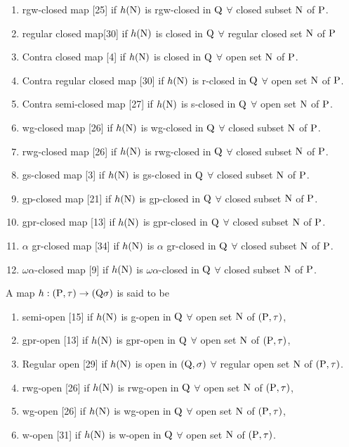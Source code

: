\begin{dfn}
\begin{enumerate}
\item  rgw-closed map [25] if $h(\mathrm{N})$ is rgw-closed in $\mathrm{Q}$  $\forall$   closed subset $\mathrm{N}$ of $\mathrm{P}$. 
\item  regular closed map[30] if $h(\mathrm{N})$ is closed in $\mathrm{Q}$  $\forall$   regular closed set $\mathrm{N}$ of $\mathrm{P}$ 
\item  Contra closed map [4] if $h(\mathrm{N})$ is closed in $\mathrm{Q}$  $\forall$   open set $\mathrm{N}$ of $\mathrm{P}$.  
\item  Contra regular closed map [30] if $h(\mathrm{N})$ is r-closed in $\mathrm{Q}$  $\forall$ open set $\mathrm{N}$ of $\mathrm{P}$. 
\item  Contra semi-closed map [27] if $h(\mathrm{N})$ is s-closed in $\mathrm{Q}$  $\forall$ open set $\mathrm{N}$ of $\mathrm{P}$.  
\item  wg-closed map [26] if $h(\mathrm{N})$ is wg-closed in $\mathrm{Q}$  $\forall$  closed subset $\mathrm{N}$ of $\mathrm{P}$.  
\item  rwg-closed map [26] if $h(\mathrm{N})$ is rwg-closed in $\mathrm{Q}$  $\forall$  closed subset $\mathrm{N}$ of $\mathrm{P}$.  
\item  gs-closed map [3] if $h(\mathrm{N})$ is gs-closed in $\mathrm{Q}$  $\forall$  closed subset $\mathrm{N}$ of $\mathrm{P}$.  
\item  gp-closed map [21] if $h(\mathrm{N})$ is gp-closed in $\mathrm{Q}$  $\forall$   closed subset $\mathrm{N}$ of $\mathrm{P}$.  
\item  gpr-closed map [13] if $h(\mathrm{N})$ is gpr-closed in $\mathrm{Q}$  $\forall$   closed subset $\mathrm{N}$ of $\mathrm{P}$.  
\item  $\alpha$ gr-closed map [34] if $h(\mathrm{N})$ is $\alpha$ gr-closed in $\mathrm{Q}$  $\forall$   closed subset $\mathrm{N}$ of $\mathrm{P}$.  
\item  $\omega\alpha$-closed map [9] if $h(\mathrm{N})$ is $\omega\alpha$-closed in $\mathrm{Q}$  $\forall$ closed subset $\mathrm{N}$ of $\mathrm{P}$.  
\end{enumerate}
\end{dfn}

\begin{dfn}\label{dfn1.4.2}
A map $h: (\mathrm{P}, \tau) \rightarrow (\mathrm{Q} \sigma)$ is said to be 
\begin{enumerate}
\item semi-open [15] if  $h(\mathrm{N})$ is g-open in $\mathrm{Q}$ $\forall$ open set $\mathrm{N}$ of $(\mathrm{P}, \tau)$, 
\item gpr-open [13] if $h(\mathrm{N})$ is gpr-open in $\mathrm{Q}$ $\forall$ open set $\mathrm{N}$ of $(\mathrm{P}, \tau)$, 
\item Regular open [29] if $h(\mathrm{N})$ is open in $(\mathrm{Q}, \sigma)$ $\forall$ regular open set $\mathrm{N}$ of $(\mathrm{P}, \tau)$. 
\item rwg-open [26] if $h(\mathrm{N})$ is rwg-open in $\mathrm{Q}$ $\forall$ open set $\mathrm{N}$ of $(\mathrm{P}, \tau)$, 
\item wg-open [26] if $h(\mathrm{N})$ is wg-open in $\mathrm{Q}$ $\forall$ open set $\mathrm{N}$ of $(\mathrm{P}, \tau)$, 
\item w-open [31] if $h(\mathrm{N})$ is w-open in $\mathrm{Q}$ $\forall$ open set $\mathrm{N}$ of $(\mathrm{P}, \tau)$.
\end{enumerate}
\end{dfn}

